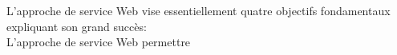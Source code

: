 	 L'approche de service Web vise essentiellement quatre objectifs fondamentaux expliquant son 
	 grand succès\cite{huhns2005service}:\\

	 L'approche de service Web permettre 

	



